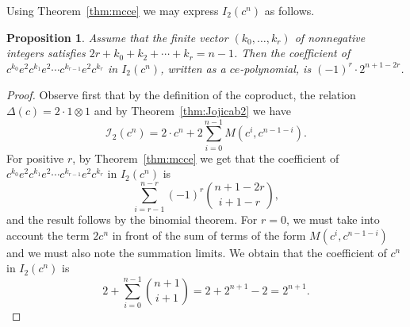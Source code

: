 \documentclass[reqno,12pt]{amsart}
\numberwithin{equation}{section}
\newtheorem{proposition}[theorem]{Proposition}
\newcommand{\0}{\widehat{0}}
\newcommand{\1}{\widehat{1}}
\newcommand{\2}{\widehat{2}}
\newcommand{\II}{I_2}
\newcommand{\IIab}{{\mathcal I}_2}
\begin{document}
Using Theorem~\ref{thm:mcce} we may express $\II(c^n)$ as follows.
\begin{proposition}
\label{prop:uce}
Assume that the finite vector  $(k_0,\ldots,k_{r})$ of nonnegative
integers satisfies $2r+k_0+k_2+\cdots+ k_{r}=n-1$. Then  
the coefficient of $c^{k_0}e^2c^{k_1} e^2\cdots c^{k_{r-1}}e^2c^{k_{r}}$ in
$\II(c^n)$, written as a $ce$-polynomial, is $(-1)^r\cdot 2^{n+1-2r}$.
\end{proposition}  
\begin{proof}
Observe first that by the definition of the coproduct, the relation
$\Delta(c)=2\cdot 1\otimes 1$  and by
Theorem~\ref{thm:Jojicab2} we have 
$$
\IIab(c^n)=2\cdot c^n+2\sum_{i=0}^{n-1} M(c^{i},c^{n-1-i}).
$$
For positive $r$, by Theorem~\ref{thm:mcce} we get that the
coefficient of $c^{k_0}e^2c^{k_1} e^2\cdots c^{k_{r-1}}e^2c^{k_{r}}$ in
$\II(c^n)$ is
$$
\sum_{i=r-1}^{n-r} (-1)^r\binom{n+1-2r}{i+1-r},
$$
and the result follows by the binomial theorem. For $r=0$, we must take
into account the term $2c^n$ in front of the sum of terms of the form
$M(c^{i},c^{n-1-i})$ and we must also note the summation limits. We
obtain that the coefficient of $c^n$ in $\II(c^n)$ is
$$
2+\sum_{i=0}^{n-1} \binom{n+1}{i+1}=2+2^{n+1}-2=2^{n+1}.
$$
\end{proof}
\end{document}
